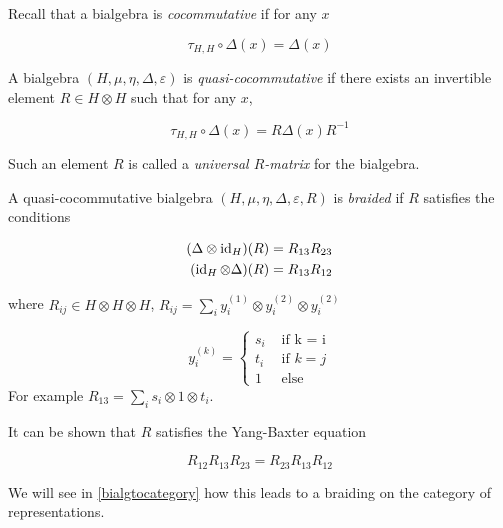 Recall that a bialgebra is \emph{cocommutative} if for any $x$

\begin{equation}
    \tau_{H,H}\circ \Delta(x)  = \Delta(x)
\end{equation}

\begin{defn}
    A bialgebra $(H,\mu,\eta, \Delta, \varepsilon)$ is
    \emph{quasi-cocommutative} if there exists an invertible element $R \in H
    \otimes H$ such that for any $x$,

    \begin{equation}
        \tau_{H,H}\circ \Delta(x)  = R \Delta(x) R^{-1}
    \end{equation}
\end{defn}

Such an element $R$ is called a \emph{universal $R$-matrix} for the bialgebra. 

\begin{defn}
    A quasi-cocommutative bialgebra $(H,\mu,\eta, \Delta, \varepsilon, R)$ is
    \emph{braided} if $R$ satisfies the conditions

    \begin{align}
        (\Delta \otimes \operatorname{id}_H)(R) = R_{13} R_{23} \\
        (\operatorname{id}_H \otimes \Delta)(R) = R_{13} R_{12} 
    \end{align}

    where $R_{ij} \in H \otimes H \otimes H$, $R_{ij} = \sum_{i} y_i^{(1)} \otimes y_{i}^{(2)} \otimes y_i^{(2)}$

    \begin{equation}
        y_i^{(k)} = \begin{cases} s_i & \text{ if k = i} \\
                                  t_i & \text{ if $k = j$} \\
                                  1   & \text{ else}
                    \end{cases}
    \end{equation}
    For example $R_{13} = \sum_{i} s_i \otimes 1 \otimes t_i$.

\end{defn}

It can be shown that $R$ satisfies the Yang-Baxter equation

\begin{equation}
    R_{12} R_{13} R_{23} = R_{23} R_{13} R_{12}
\end{equation}

We will see in \ref{bialgtocategory} how this leads to a braiding on the
category of representations.
